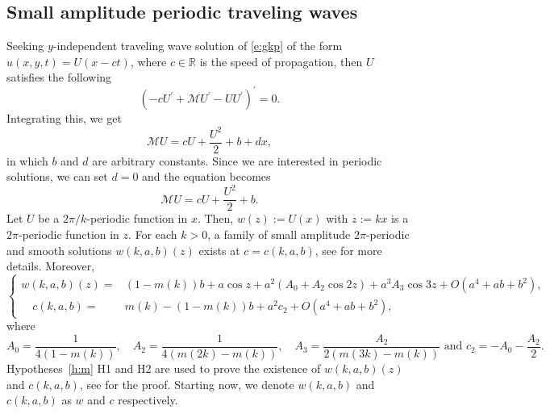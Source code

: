\documentclass[12pt]{amsart}    %
\newcommand{\R}{\mathbb{R}}
\newcommand{\calM}{\mathcal{M}}
\numberwithin{equation}{section}
\begin{document}


\subsection*{Small amplitude periodic traveling waves} Seeking $y$-independent traveling wave solution of \eqref{e:gkp} of the form 
$u(x,y,t)=U(x-ct)$, where $c\in\R$ is the speed of propagation, then $U$ satisfies the following
\[
\left(-c U^\prime+\calM U^\prime-U U^\prime\right)^\prime=0.
\]
Integrating this, we get
\[
\calM U= cU +\frac{U^{2}}{2}+b+dx,
\]
in which $b$ and $d$ are arbitrary constants. Since we are interested in periodic solutions, we can set $d=0$ and the equation becomes
\begin{equation}\label{e:onedtw}
\calM U= cU +\frac{U^{2}}{2}+b.
\end{equation}
Let $U$ be a $2\pi/k$-periodic function in $x$. Then, $w(z):=U(x)$ with $z:=kx$ is a $2\pi$-periodic function in $z$. For each $k>0$, a family of small amplitude $2\pi$-periodic and smooth solutions $w(k,a,b)(z)$ exists at $c=c(k,a,b)$, see \cite[Proposition~2.2]{Hur2015ModulationalWaves} for more details. Moreover,
\begin{equation}\label{e:expptw}
\left\{
\begin{aligned}
w(k,a,b)(z) =&(1-m(k))b +a\cos z+a^2(A_0+A_2\cos 2z)+a^3A_3\cos 3z+O(a^4+ab+b^2),\\
\quad c(k,a,b)=&m(k)-(1-m(k))b+a^2 c_2+O(a^4+ab+b^2),
\end{aligned}
\right.
\end{equation}
where
\begin{equation}
 A_0=\frac{1}{4(1-m(k))}, \quad
    A_2=\frac{1}{4(m(2k)-m(k))}, \quad
    A_3=\dfrac{A_2}{2(m(3k)-m(k))}\text{ and }
    c_2=-A_0-\frac{A_2}{2}. \label{e:A_0A2c2}
\end{equation}
Hypotheses~\ref{h:m} H1 and H2 are used to prove the existence of $w(k,a,b)(z)$ and $c(k,a,b)$, see \cite[Proposition~2.2]{Hur2015ModulationalWaves} for the proof. Starting now, we denote $w(k,a,b)$ and $c(k,a,b)$ as $w$ and $c$ respectively. 
\end{document}
